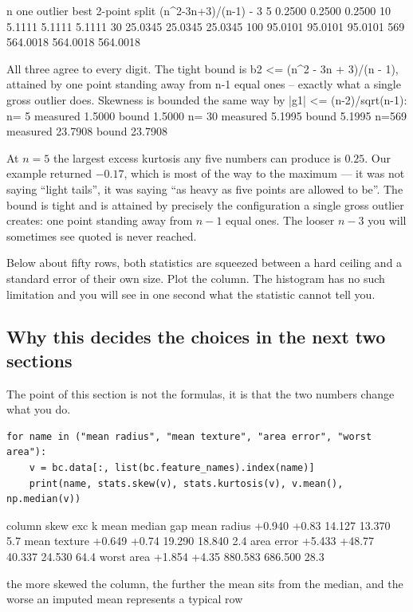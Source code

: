 \documentclass[11pt]{article}
\begin{document}
\begin{codeout}
     n    one outlier   best 2-point split   (n^2-3n+3)/(n-1) - 3
     5         0.2500               0.2500                 0.2500
    10         5.1111               5.1111                 5.1111
    30        25.0345              25.0345                25.0345
   100        95.0101              95.0101                95.0101
   569       564.0018             564.0018               564.0018

All three agree to every digit.  The tight bound is
    b2 <= (n^2 - 3n + 3)/(n - 1),   attained by one point standing
away from n-1 equal ones -- exactly what a single gross outlier does.
Skewness is bounded the same way by |g1| <= (n-2)/sqrt(n-1):
    n=  5  measured   1.5000  bound   1.5000
    n= 30  measured   5.1995  bound   5.1995
    n=569  measured  23.7908  bound  23.7908
\end{codeout}

At $n = 5$ the largest excess kurtosis any five numbers can produce is
$\mathbf{0.25}$. Our example returned $-0.17$, which is most of the way to the
maximum --- it was not saying ``light tails'', it was saying ``as heavy as five
points are allowed to be''. The bound is tight and is attained by precisely the
configuration a single gross outlier creates: one point standing away from
$n-1$ equal ones. The looser $n-3$ you will sometimes see quoted is never
reached.

\begin{caution}
Below about fifty rows, both statistics are squeezed between a hard ceiling and
a standard error of their own size. Plot the column. The histogram has no such
limitation and you will see in one second what the statistic cannot tell you.
\end{caution}

\subsection{Why this decides the choices in the next two sections}

The point of this section is not the formulas, it is that the two numbers
change what you do.

\begin{lstlisting}
for name in ("mean radius", "mean texture", "area error", "worst area"):
    v = bc.data[:, list(bc.feature_names).index(name)]
    print(name, stats.skew(v), stats.kurtosis(v), v.mean(), np.median(v))
\end{lstlisting}
\begin{codeout}
column            skew     exc k       mean     median     gap %
mean radius     +0.940     +0.83     14.127     13.370      5.7%
mean texture    +0.649     +0.74     19.290     18.840      2.4%
area error      +5.433    +48.77     40.337     24.530      64.4%
worst area      +1.854     +4.35    880.583    686.500      28.3%

the more skewed the column, the further the mean sits from the median,
and the worse an imputed mean represents a typical row
\end{codeout}
\end{document}
